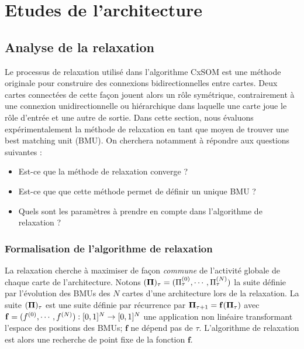 \chapter{Etudes de l'architecture}
\graphicspath{{04-Analyse/}}
\minitoc
\section{Analyse de la relaxation}
Le processus de relaxation utilisé dans l'algorithme CxSOM est une méthode originale pour construire des connexions bidirectionnelles entre cartes. Deux cartes connectées de cette façon jouent alors un rôle symétrique, contrairement à une connexion unidirectionnelle ou hiérarchique dans laquelle une carte joue le rôle d'entrée et une autre de sortie. Dans cette section, nous évaluons expérimentalement la méthode de relaxation en tant que moyen de trouver une best matching unit (BMU). On cherchera notamment à répondre aux questions suivantes :  
\begin{itemize}
\item Est-ce que la méthode de relaxation converge ?
\item Est-ce que que cette méthode permet de définir un unique BMU ?
\item Quels sont les paramètres à prendre en compte dans l'algorithme de relaxation ?
\end{itemize}

\subsection{Formalisation de l'algorithme de relaxation}

La relaxation cherche à maximiser de façon \emph{commune} de l'activité globale de chaque carte de l'architecture. Notons $(\mathbf{\Pi})_\tau = (\Pi^{({0})}_\tau,\cdots,\Pi^{({N})}_\tau)$ la suite définie par l'évolution des BMUs des $N$ cartes d'une architecture lors de la relaxation.
La suite $(\mathbf{\Pi})_\tau$ est une suite définie par récurrence par $\mathbf{\Pi}_{\tau+1} = \mathbf{f}(\mathbf{\Pi}_\tau)$
avec $\mathbf{f} = (f^{({0})},\cdots,f^{({N})}) : [0,1]^N \rightarrow [0,1]^N$ une application non linéaire transformant l'espace des positions des BMUs; $\mathbf{f}$ ne dépend pas de $\tau$. L'algorithme de relaxation est alors une recherche de point fixe de la fonction $\mathbf{f}$.


